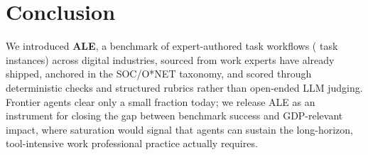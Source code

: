 \section{Conclusion}
\label{sec:conclusion}

We introduced \textbf{ALE}, a benchmark of \totaltasks{} expert-authored task workflows (\totalvariants{} task instances) across \taskcount{} digital industries, sourced from work experts have already shipped, anchored in the SOC/O*NET taxonomy, and scored through deterministic checks and structured rubrics rather than open-ended LLM judging. Frontier agents clear only a small fraction today; we release ALE as an instrument for closing the gap between benchmark success and GDP-relevant impact, where saturation would signal that agents can sustain the long-horizon, tool-intensive work professional practice actually requires.
